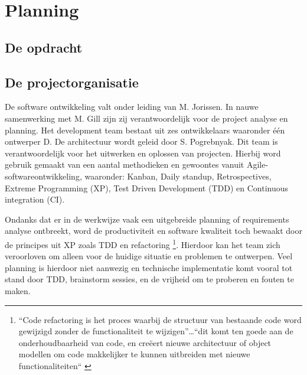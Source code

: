 \chapter{Planning} %

\section{De opdracht} %

\section{De projectorganisatie} %


De software ontwikkeling valt onder leiding van M. Jorissen. In nauwe samenwerking met M. Gill zijn zij verantwoordelijk voor de project analyse en planning. Het development team bestaat uit zes ontwikkelaars waaronder één ontwerper D.  De architectuur wordt geleid door S. Pogrebnyak. Dit team is verantwoordelijk voor het uitwerken en oplossen van projecten. Hierbij word gebruik gemaakt van een aantal methodieken en gewoontes vanuit Agile-softwareontwikkeling, waaronder: Kanban, Daily standup, Retrospectives, Extreme Programming (XP), Test Driven Development (TDD) en Continuous integration (CI).

Ondanks dat er in de werkwijze vaak een uitgebreide planning of requirements analyse ontbreekt, word de productiviteit en software kwaliteit toch bewaakt door de principes uit XP zoals TDD en refactoring \footnote{“Code refactoring is het proces waarbij de structuur van bestaande code word gewijzigd zonder de functionaliteit te wijzigen”…“dit komt ten goede aan de onderhoudbaarheid van code, en creëert nieuwe architectuur of object modellen om code makkelijker te kunnen uitbreiden met nieuwe functionaliteiten“ \parencite{refactoring}}. Hierdoor kan het team zich veroorloven om alleen voor de huidige situatie en problemen te ontwerpen. Veel planning is hierdoor niet aanwezig en technische implementatie komt vooral tot stand door TDD, brainstorm sessies, en de vrijheid om te proberen en fouten te maken.

